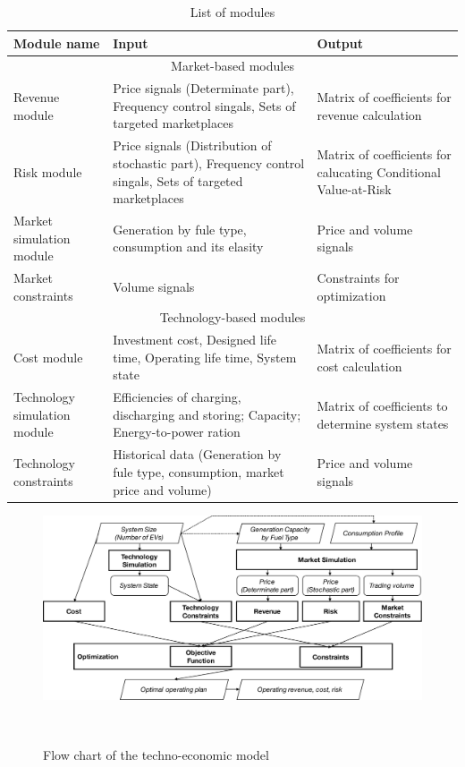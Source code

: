 \begin{table}
	\label{tb:modules}
\begin{center}
	\begin{tabular}{| m{2.5cm} | m{4.5 cm} | m{4.5cm} |}
		\hline
		\textbf{Module name} & \textbf{Input} & \textbf{Output} %
		 \\[0.5ex]
		\hline \hline
		\multicolumn{3}{|c|}{Market-based modules }\\
		\hline
		Revenue module & Price signals (Determinate part), Frequency control singals, Sets of targeted marketplaces & Matrix of coefficients for revenue calculation %
		\\
		\hline
		Risk module & Price signals (Distribution of stochastic part), Frequency control singals, Sets of targeted marketplaces& Matrix of coefficients for calucating Conditional Value-at-Risk %
		\\
		\hline
		Market simulation module & Generation by fule type, consumption and its elasity& Price and volume signals%
		\\
		\hline
		Market constraints & Volume signals & Constraints for optimization %
		\\
		\hline
		\hline
		\multicolumn{3}{|c|}{Technology-based modules }\\
		\hline
		Cost module & Investment cost, Designed life time, Operating life time, System state & Matrix of coefficients for cost calculation %
		\\
		\hline
		Technology simulation module & Efficiencies of charging, discharging and storing; Capacity; Energy-to-power ration& Matrix of coefficients to determine system states %
		 \\
		\hline
		Technology constraints & Historical data (Generation by fule type, consumption, market price and volume)& Price and volume signals %
		\\
		\hline
	\end{tabular}
\end{center}
\caption{List of modules}
\end{table}

 \begin{figure}[h!]
	\label{fig:model-flow}
	\includegraphics[scale=0.4]{Figures/ModelFlow.pdf}
	\caption{Flow chart of the techno-economic model}\
\end{figure}

